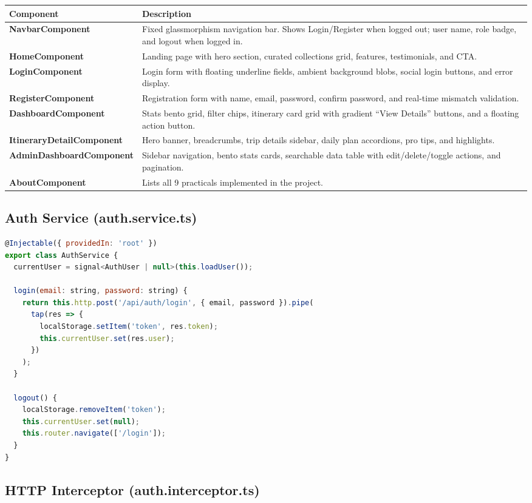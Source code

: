 \documentclass[12pt,a4paper]{article}
\begin{document}
\begin{longtable}{>{\bfseries}p{4.5cm} p{9cm}}
\toprule
Component & Description \\
\midrule
\endhead
NavbarComponent & Fixed glassmorphism navigation bar. Shows Login/Register when logged out; user name, role badge, and logout when logged in. \\
HomeComponent & Landing page with hero section, curated collections grid, features, testimonials, and CTA. \\
LoginComponent & Login form with floating underline fields, ambient background blobs, social login buttons, and error display. \\
RegisterComponent & Registration form with name, email, password, confirm password, and real-time mismatch validation. \\
DashboardComponent & Stats bento grid, filter chips, itinerary card grid with gradient ``View Details'' buttons, and a floating action button. \\
ItineraryDetailComponent & Hero banner, breadcrumbs, trip details sidebar, daily plan accordions, pro tips, and highlights. \\
AdminDashboardComponent & Sidebar navigation, bento stats cards, searchable data table with edit/delete/toggle actions, and pagination. \\
AboutComponent & Lists all 9 practicals implemented in the project. \\
\bottomrule
\end{longtable}

\subsection{Auth Service (auth.service.ts)}

\begin{lstlisting}[language=JavaScript]
@Injectable({ providedIn: 'root' })
export class AuthService {
  currentUser = signal<AuthUser | null>(this.loadUser());

  login(email: string, password: string) {
    return this.http.post('/api/auth/login', { email, password }).pipe(
      tap(res => {
        localStorage.setItem('token', res.token);
        this.currentUser.set(res.user);
      })
    );
  }

  logout() {
    localStorage.removeItem('token');
    this.currentUser.set(null);
    this.router.navigate(['/login']);
  }
}
\end{lstlisting}

\subsection{HTTP Interceptor (auth.interceptor.ts)}
\end{document}
